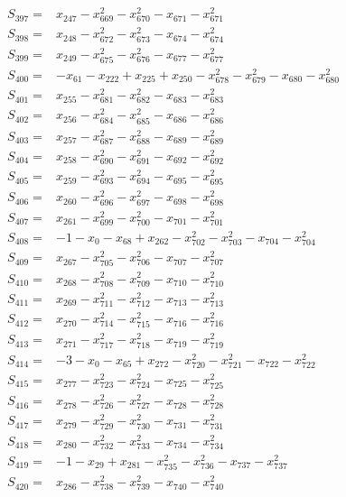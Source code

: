 \begin{align*}
S_{397}={}&x_{247}-x_{669}^{2}-x_{670}^{2}-x_{671}-x_{671}^{2}\\[3pt]
S_{398}={}&x_{248}-x_{672}^{2}-x_{673}^{2}-x_{674}-x_{674}^{2}\\[3pt]
S_{399}={}&x_{249}-x_{675}^{2}-x_{676}^{2}-x_{677}-x_{677}^{2}\\[3pt]
S_{400}={}&-x_{61}-x_{222}+x_{225}+x_{250}-x_{678}^{2}-x_{679}^{2}-x_{680}-x_{680}^{2}\\[3pt]
S_{401}={}&x_{255}-x_{681}^{2}-x_{682}^{2}-x_{683}-x_{683}^{2}\\[3pt]
S_{402}={}&x_{256}-x_{684}^{2}-x_{685}^{2}-x_{686}-x_{686}^{2}\\[3pt]
S_{403}={}&x_{257}-x_{687}^{2}-x_{688}^{2}-x_{689}-x_{689}^{2}\\[3pt]
S_{404}={}&x_{258}-x_{690}^{2}-x_{691}^{2}-x_{692}-x_{692}^{2}\\[3pt]
S_{405}={}&x_{259}-x_{693}^{2}-x_{694}^{2}-x_{695}-x_{695}^{2}\\[3pt]
S_{406}={}&x_{260}-x_{696}^{2}-x_{697}^{2}-x_{698}-x_{698}^{2}\\[3pt]
S_{407}={}&x_{261}-x_{699}^{2}-x_{700}^{2}-x_{701}-x_{701}^{2}\\[3pt]
S_{408}={}&-1-x_{0}-x_{68}+x_{262}-x_{702}^{2}-x_{703}^{2}-x_{704}-x_{704}^{2}\\[3pt]
S_{409}={}&x_{267}-x_{705}^{2}-x_{706}^{2}-x_{707}-x_{707}^{2}\\[3pt]
S_{410}={}&x_{268}-x_{708}^{2}-x_{709}^{2}-x_{710}-x_{710}^{2}\\[3pt]
S_{411}={}&x_{269}-x_{711}^{2}-x_{712}^{2}-x_{713}-x_{713}^{2}\\[3pt]
S_{412}={}&x_{270}-x_{714}^{2}-x_{715}^{2}-x_{716}-x_{716}^{2}\\[3pt]
S_{413}={}&x_{271}-x_{717}^{2}-x_{718}^{2}-x_{719}-x_{719}^{2}\\[3pt]
S_{414}={}&-3-x_{0}-x_{65}+x_{272}-x_{720}^{2}-x_{721}^{2}-x_{722}-x_{722}^{2}\\[3pt]
S_{415}={}&x_{277}-x_{723}^{2}-x_{724}^{2}-x_{725}-x_{725}^{2}\\[3pt]
S_{416}={}&x_{278}-x_{726}^{2}-x_{727}^{2}-x_{728}-x_{728}^{2}\\[3pt]
S_{417}={}&x_{279}-x_{729}^{2}-x_{730}^{2}-x_{731}-x_{731}^{2}\\[3pt]
S_{418}={}&x_{280}-x_{732}^{2}-x_{733}^{2}-x_{734}-x_{734}^{2}\\[3pt]
S_{419}={}&-1-x_{29}+x_{281}-x_{735}^{2}-x_{736}^{2}-x_{737}-x_{737}^{2}\\[3pt]
S_{420}={}&x_{286}-x_{738}^{2}-x_{739}^{2}-x_{740}-x_{740}^{2}\\[3pt]

\end{align*}
